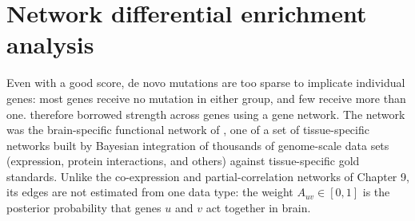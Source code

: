 \section{Network differential enrichment analysis}
\label{sec:ndea}

Even with a good score, de novo mutations are too sparse to implicate individual genes: most genes receive no mutation in either group, and few receive more than one. \citet{zhou2019} therefore borrowed strength across genes using a gene network. The network was the brain-specific functional network of \citet{greene2015}, one of a set of tissue-specific networks built by Bayesian integration of thousands of genome-scale data sets (expression, protein interactions, and others) against tissue-specific gold standards. Unlike the co-expression and partial-correlation networks of Chapter 9, its edges are not estimated from one data type: the weight $A_{uv}\in[0,1]$ is the posterior probability that genes $u$ and $v$ act together in brain.

